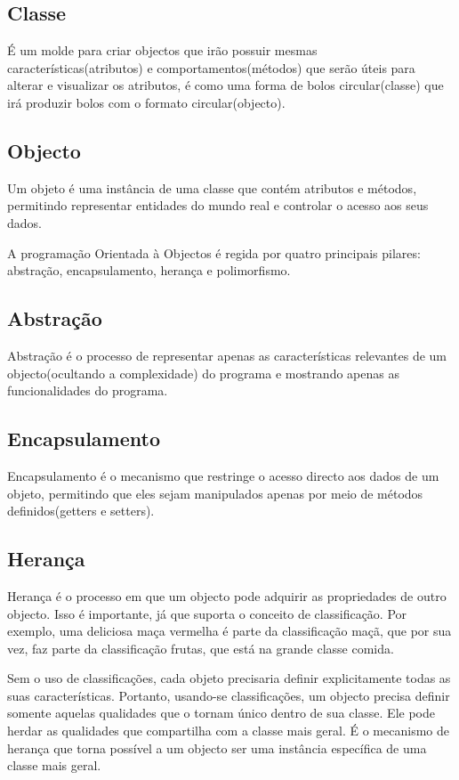 \documentclass[a4paper,12pt]{article}
\begin{document}
 \subsection{Classe}
É um molde para criar objectos que irão possuir mesmas características(atributos) e comportamentos(métodos) que serão úteis para alterar e visualizar os atributos, é 
como uma forma de bolos circular(classe) que irá produzir bolos com o formato circular(objecto).

 \subsection{Objecto}
 Um objeto é uma instância de uma classe que contém atributos e métodos, permitindo representar
  entidades do mundo real e controlar o acesso aos seus dados.


 A programação Orientada à Objectos é regida por quatro principais pilares: abstração, encapsulamento, herança e polimorfismo.

 \subsection{Abstração}
 Abstração é o processo de representar apenas as características relevantes de um objecto(ocultando a complexidade) do programa e mostrando
 apenas as funcionalidades do programa. 

 \subsection{Encapsulamento}
Encapsulamento é o mecanismo que restringe o acesso directo aos dados de um objeto, permitindo que eles sejam 
manipulados apenas por meio de métodos definidos(getters e setters).

\subsection{Herança}
Herança é o processo em que um objecto pode adquirir as propriedades 
de outro objecto. Isso é importante, já que suporta o conceito de classificação. Por 
exemplo, uma deliciosa maça vermelha é parte da classificação maçã, que por sua 
vez, faz parte da classificação frutas, que está na grande classe comida.

Sem o uso 
de classificações, cada objeto precisaria definir explicitamente todas as suas 
características. Portanto, usando-se classificações, um objecto precisa definir 
somente aquelas qualidades que o tornam único dentro de sua classe. Ele pode 
herdar as qualidades que compartilha com a classe mais geral. É o mecanismo de 
herança que torna possível a um objecto ser uma instância específica de uma classe 
mais geral.
\end{document}
